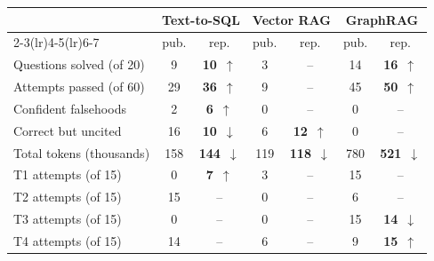 \begin{tabular}{@{}l cc cc cc@{}}
\toprule
& \multicolumn{2}{c}{\textbf{Text-to-SQL}} & \multicolumn{2}{c}{\textbf{Vector RAG}} & \multicolumn{2}{c}{\textbf{GraphRAG}} \\
\cmidrule(lr){2-3}\cmidrule(lr){4-5}\cmidrule(lr){6-7}
& pub. & rep. & pub. & rep. & pub. & rep. \\
\midrule
Questions solved (of 20) & 9 & \textbf{10}~\textcolor{okcol}{$\uparrow$} & 3 & \textcolor{gray!60}{--} & 14 & \textbf{16}~\textcolor{okcol}{$\uparrow$} \\
Attempts passed (of 60) & 29 & \textbf{36}~\textcolor{okcol}{$\uparrow$} & 9 & \textcolor{gray!60}{--} & 45 & \textbf{50}~\textcolor{okcol}{$\uparrow$} \\
Confident falsehoods & 2 & \textbf{6}~\textcolor{badcol}{$\uparrow$} & 0 & \textcolor{gray!60}{--} & 0 & \textcolor{gray!60}{--} \\
Correct but uncited & 16 & \textbf{10}~\textcolor{okcol}{$\downarrow$} & 6 & \textbf{12}~\textcolor{badcol}{$\uparrow$} & 0 & \textcolor{gray!60}{--} \\
Total tokens (thousands) & 158 & \textbf{144}~\textcolor{okcol}{$\downarrow$} & 119 & \textbf{118}~\textcolor{okcol}{$\downarrow$} & 780 & \textbf{521}~\textcolor{okcol}{$\downarrow$} \\
\midrule
T1 attempts (of 15) & 0 & \textbf{7}~\textcolor{okcol}{$\uparrow$} & 3 & \textcolor{gray!60}{--} & 15 & \textcolor{gray!60}{--} \\
T2 attempts (of 15) & 15 & \textcolor{gray!60}{--} & 0 & \textcolor{gray!60}{--} & 6 & \textcolor{gray!60}{--} \\
T3 attempts (of 15) & 0 & \textcolor{gray!60}{--} & 0 & \textcolor{gray!60}{--} & 15 & \textbf{14}~\textcolor{badcol}{$\downarrow$} \\
T4 attempts (of 15) & 14 & \textcolor{gray!60}{--} & 6 & \textcolor{gray!60}{--} & 9 & \textbf{15}~\textcolor{okcol}{$\uparrow$} \\
\bottomrule
\end{tabular}
